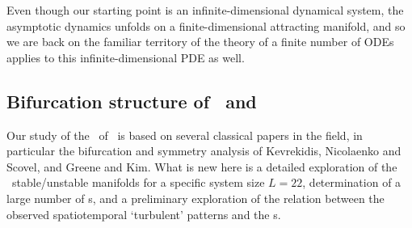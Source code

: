 %
%

Even though our starting point
is an infinite-dimensional dynamical system, the asymptotic dynamics
unfolds on a finite-dimensional attracting manifold, and so we are back on
the familiar territory of
the theory of a finite number of ODEs applies to this
infinite-dimensional PDE as well.

\subsection{Bifurcation structure of \eqva\ and \reqva}
\label{sec:KSlit}

Our study of the \eqva\ of
\KSe\ is based on several classical papers in the field,
in particular the bifurcation and symmetry analysis of
Kevrekidis, Nicolaenko and Scovel,
and Greene and Kim. What is new here is
a detailed exploration of the \eqva\ stable/unstable manifolds
for a specific system size $L = 22$, determination
of a large number of \rpo s, and a preliminary
exploration of the relation between the
observed spatiotemporal `turbulent' patterns and
the \rpo s.



